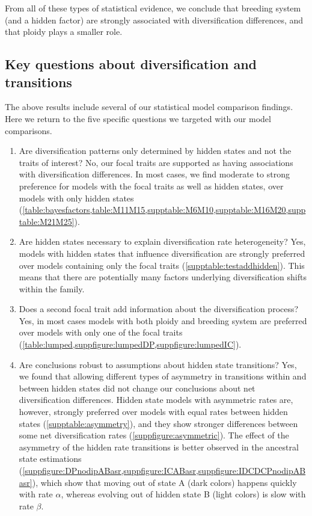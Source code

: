From all of these types of statistical evidence, we conclude that breeding system (and a hidden factor) are strongly associated with diversification differences, and that ploidy plays a smaller role.


\subsection{Key questions about diversification and transitions}

The above results include several of our statistical model comparison findings.
Here we return to the five specific questions we targeted with our model comparisons.

\begin{enumerate}

    \item Are diversification patterns only determined by hidden states and not the traits of interest?
    No, our focal traits are supported as having associations with diversification differences.
    In most cases, we find moderate to strong preference for models with the focal traits as well as hidden states, over models with only hidden states (\cref{table:bayesfactors,table:M11M15,supptable:M6M10,supptable:M16M20,supptable:M21M25}). %

    \item Are hidden states necessary to explain diversification rate heterogeneity?
    Yes, models with hidden states that influence diversification are strongly preferred over models containing only the focal traits (\cref{supptable:testaddhidden}).
    This means that there are potentially many factors underlying diversification shifts within the family. %

    \item Does a second focal trait add information about the diversification process?
    Yes, in most cases models with both ploidy and breeding system are preferred over models with only one of the focal traits (\cref{table:lumped,suppfigure:lumpedDP,suppfigure:lumpedIC}).

    \item Are conclusions robust to assumptions about hidden state transitions?
    Yes, we found that allowing different types of asymmetry in transitions within and between hidden states did not change our conclusions about net diversification differences.
    Hidden state models with asymmetric rates are, however, strongly preferred over models with equal rates between hidden states (\cref{supptable:asymmetry}), and they show stronger differences between some net diversification rates (\cref{suppfigure:asymmetric}).
    The effect of the asymmetry of the hidden rate transitions  is better observed in the ancestral state estimations (\cref{suppfigure:DPnodipABasr,suppfigure:ICABasr,suppfigure:IDCDCPnodipABasr}), which show that moving out of state A (dark colors) happens quickly with rate $\alpha$,  whereas evolving out of hidden state B (light colors) is slow with rate $\beta$. 
        

\end{enumerate}
